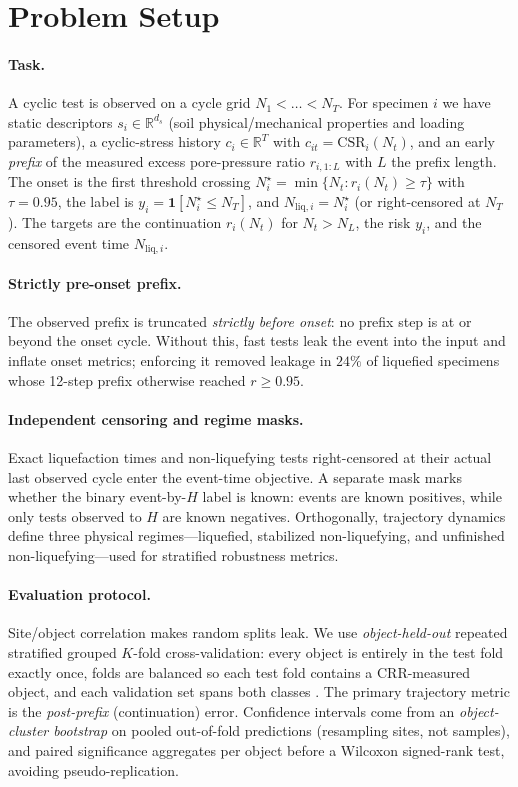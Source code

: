 \documentclass[letterpaper]{article} %
\begin{document}
\section{Problem Setup}
\paragraph{Task.} A cyclic test is observed on a cycle grid $N_1<\dots<N_T$. For specimen $i$ we have
static descriptors $s_i\in\mathbb{R}^{d_s}$ (soil physical/mechanical properties and loading parameters),
a cyclic-stress history $c_i\in\mathbb{R}^{T}$ with $c_{it}=\mathrm{CSR}_i(N_t)$, and an early
\emph{prefix} of the measured excess pore-pressure ratio $r_{i,1:L}$ with $L$ the prefix length. The onset
is the first threshold crossing $N^\star_i=\min\{N_t: r_i(N_t)\ge\tau\}$ with $\tau=0.95$, the label is
$y_i=\mathbf{1}[N^\star_i\le N_T]$, and $N_{\mathrm{liq},i}=N^\star_i$ (or right-censored at $N_T$). The
targets are the continuation $r_i(N_t)$ for $N_t>N_L$, the risk $y_i$, and the censored event time
$N_{\mathrm{liq},i}$.

\paragraph{Strictly pre-onset prefix.} The observed prefix is truncated \emph{strictly before onset}: no
prefix step is at or beyond the onset cycle. Without this, fast tests leak the event into the input and
inflate onset metrics; enforcing it removed leakage in $24\%$ of liquefied specimens whose 12-step prefix
otherwise reached $r\ge 0.95$.

\paragraph{Independent censoring and regime masks.} Exact liquefaction times and non-liquefying tests
right-censored at their actual last observed cycle enter the event-time objective. A separate mask marks
whether the binary event-by-$H$ label is known: events are known positives, while only tests observed to
$H$ are known negatives. Orthogonally, trajectory dynamics define three physical regimes---liquefied,
stabilized non-liquefying, and unfinished non-liquefying---used for stratified robustness metrics.

\paragraph{Evaluation protocol.} Site/object correlation makes random splits leak. We use
\emph{object-held-out} repeated stratified grouped $K$-fold cross-validation: every object is entirely in
the test fold exactly once, folds are balanced so each test fold contains a CRR-measured object, and each
validation set spans both classes \citep{roberts17}. The primary trajectory metric is the
\emph{post-prefix} (continuation) error. Confidence intervals come from an \emph{object-cluster bootstrap}
on pooled out-of-fold predictions (resampling sites, not samples), and paired significance aggregates
per object before a Wilcoxon signed-rank test, avoiding pseudo-replication.
\end{document}

